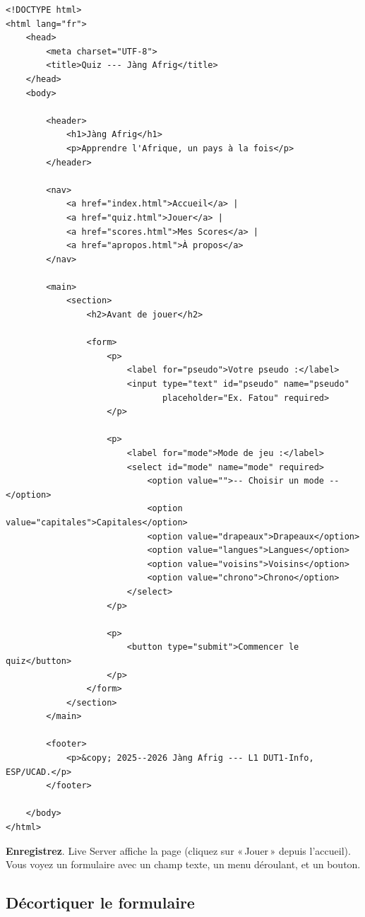 \documentclass[11pt,a4paper]{article}
\newcommand{\cmark}{\ding{51}}
\begin{document}
\begin{lstlisting}[language=HTML5]
<!DOCTYPE html>
<html lang="fr">
    <head>
        <meta charset="UTF-8">
        <title>Quiz --- Jàng Afrig</title>
    </head>
    <body>

        <header>
            <h1>Jàng Afrig</h1>
            <p>Apprendre l'Afrique, un pays à la fois</p>
        </header>

        <nav>
            <a href="index.html">Accueil</a> |
            <a href="quiz.html">Jouer</a> |
            <a href="scores.html">Mes Scores</a> |
            <a href="apropos.html">À propos</a>
        </nav>

        <main>
            <section>
                <h2>Avant de jouer</h2>

                <form>
                    <p>
                        <label for="pseudo">Votre pseudo :</label>
                        <input type="text" id="pseudo" name="pseudo"
                               placeholder="Ex. Fatou" required>
                    </p>

                    <p>
                        <label for="mode">Mode de jeu :</label>
                        <select id="mode" name="mode" required>
                            <option value="">-- Choisir un mode --</option>
                            <option value="capitales">Capitales</option>
                            <option value="drapeaux">Drapeaux</option>
                            <option value="langues">Langues</option>
                            <option value="voisins">Voisins</option>
                            <option value="chrono">Chrono</option>
                        </select>
                    </p>

                    <p>
                        <button type="submit">Commencer le quiz</button>
                    </p>
                </form>
            </section>
        </main>

        <footer>
            <p>&copy; 2025--2026 Jàng Afrig --- L1 DUT1-Info, ESP/UCAD.</p>
        </footer>

    </body>
</html>
\end{lstlisting}

\textbf{Enregistrez}. Live Server affiche la page (cliquez sur «\,Jouer\,» depuis
l'accueil). Vous voyez un formulaire avec un champ texte, un menu
déroulant, et un bouton. \cmark

\subsection{Décortiquer le formulaire}
\end{document}
